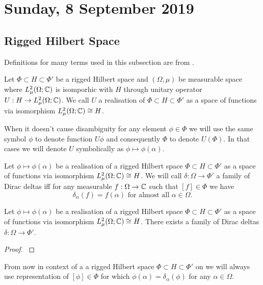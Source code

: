 \documentclass[main.tex]{subfiles}
\begin{document}
\section{Sunday, 8 September 2019}
\subsection{Rigged Hilbert Space}
Definitions for many terms used in this subsection are from \cite{gelfand1964}.
\begin{definition}
Let $\Phi \subset H \subset \Phi'$ be a rigged Hilbert space and $(\Omega, \mu)$ be measurable space where $L_\mu^2(\Omega;\mathbb{C})$ is isomporhic with $H$ through unitary operator $U:H \to L_\mu^2(\Omega;\mathbb{C})$. We call $U$ a realisation of $\Phi \subset H \subset \Phi'$ as a space of functions via isomorphism $L_\mu^2(\Omega;\mathbb{C})\cong H$.
\end{definition}
When it doesn't cause disambiguity for any element $\phi\in\Phi$ we will use the same symbol $\phi$ to denote function $U\phi$ and consequently $\Phi$ to denote $U(\Phi)$. In that cases we will denote $U$ symbolically as $\phi\mapsto \phi(\alpha)$.
\begin{definition}
Let $\phi\mapsto \phi(\alpha)$ be a realisation of a rigged Hilbert space $\Phi \subset H \subset \Phi'$ as a space of functions via isomorphism $L_\mu^2(\Omega;\mathbb{C})\cong H$. We will call $\delta:\Omega\to \Phi'$ a family of Dirac deltas iff for any measurable $f:\Omega\to \mathbb{C}$ such that $[f]\in \Phi$ we have
\begin{equation}
\delta_\alpha(f) = f(\alpha) \text{ for almost all } \alpha\in\Omega. 
\end{equation}
\end{definition}

\begin{theorem}
Let $\phi\mapsto \phi(\alpha)$ be a realisation of a rigged Hilbert space $\Phi \subset H \subset \Phi'$ as a space of functions via isomorphism $L_\mu^2(\Omega;\mathbb{C})\cong H$. There exists a family of Dirac deltas $\delta:\Omega\to \Phi'$.
\end{theorem}
\begin{proof}
\cite[See][Ch. I.4.3]{gelfand1964}
\end{proof}
From now in context of a a rigged Hilbert space $\Phi \subset H \subset \Phi'$ on we will always use representation of $[\phi]\in\Phi$ for which $\phi(\alpha) = \delta_\alpha(\phi)$ for any $\alpha\in \Omega$.
\end{document}
